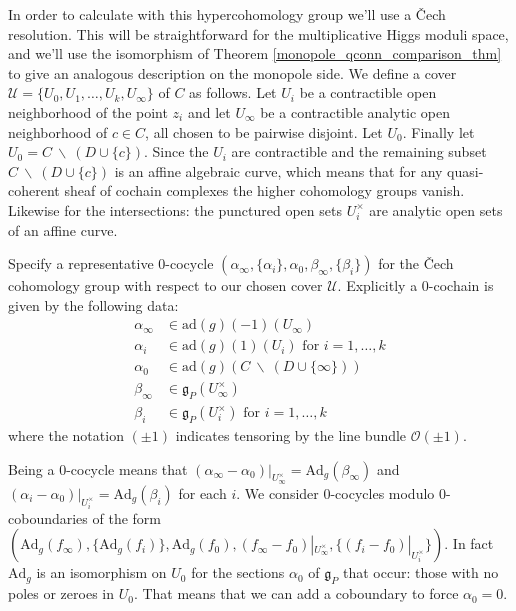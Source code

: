 \documentclass[11pt, oneside, reqno]{amsart}
\theoremstyle{definition} \newtheorem{definition}{Definition}[section]
\theoremstyle{definition} \newtheorem{remark}[definition]{Remark}
\theoremstyle{definition} \newtheorem{remarks}[definition]{Remarks}
\theoremstyle{definition} \newtheorem{question}[definition]{Question}
\theoremstyle{definition} \newtheorem*{note}{Note}
\theoremstyle{definition} \newtheorem{example}[definition]{Example}
\theoremstyle{definition} \newtheorem{examples}[definition]{Examples}
\renewcommand{\gg}{\mathfrak{g}}
\newcommand{\mr}[1]{\mathrm{#1}}
\newcommand{\mc}[1]{\mathcal{#1}}
\newcommand{\bs}{\ \backslash \ }
\newcommand{\OO}{\mathcal{O}}
\newcommand{\ad}{\mr{ad}}
\begin{document}
In order to calculate with this hypercohomology group we'll use a \v Cech resolution.  This will be straightforward for the multiplicative Higgs moduli space, and we'll use the isomorphism of Theorem \ref{monopole_qconn_comparison_thm} to give an analogous description on the monopole side.    We define a cover $\mc U = \{U_0, U_1, \ldots, U_k, U_\infty\}$ of $C$ as follows.  Let $U_i$ be a contractible open neighborhood of the point $z_i$ and let $U_\infty$ be a contractible analytic open neighborhood of $c \in C$, all chosen to be pairwise disjoint.  Let $U_0$.  Finally let $U_0 = C \bs (D \cup \{c\})$.  Since the $U_i$ are contractible and the remaining subset $C \bs (D \cup \{c\})$ is an affine algebraic curve, which means that for any quasi-coherent sheaf of cochain complexes the higher cohomology groups vanish.  Likewise for the intersections: the punctured open sets $U_i^\times$ are analytic open sets of an affine curve.  

Specify a representative 0-cocycle $(\alpha_\infty, \{\alpha_i\}, \alpha_0, \beta_\infty, \{\beta_i\})$ for the \v Cech cohomology group with respect to our chosen cover $\mc U$.  Explicitly a 0-cochain is given by the following data:
\begin{align*}
 \alpha_\infty &\in \ad(g)(-1)(U_\infty) \\
 \alpha_i &\in \ad(g)(1)(U_i) \text{ for } i = 1,\ldots,k \\
 \alpha_0 &\in \ad(g)(C \bs (D \cup \{\infty\})) \\
 \beta_\infty &\in \gg_P(U^\times_\infty) \\
 \beta_i &\in \gg_P(U^\times_i) \text{ for } i=1,\ldots,k
\end{align*}
where the notation $(\pm 1)$ indicates tensoring by the line bundle $\OO(\pm 1)$.

Being a 0-cocycle means that $(\alpha_\infty - \alpha_0)|_{U^\times_\infty} = \mr{Ad}_g(\beta_\infty)$ and $(\alpha_i - \alpha_0)|_{U^\times_i} = \mr{Ad}_g(\beta_i)$ for each $i$.  We consider 0-cocycles modulo 0-coboundaries of the form $(\mr{Ad}_g(f_\infty), \{\mr{Ad}_g(f_i)\}, \mr{Ad}_g(f_0), (f_\infty -  f_0)|_{U_\infty^\times}, \{(f_i - f_0)|_{U_i^\times}\})$.  In fact $\mr{Ad}_g$ is an isomorphism on $U_0$ for the sections $\alpha_0$ of $\gg_P$ that occur: those with no poles or zeroes in $U_0$.  That means that we can add a coboundary to force $\alpha_0=0$. 
\end{document}
